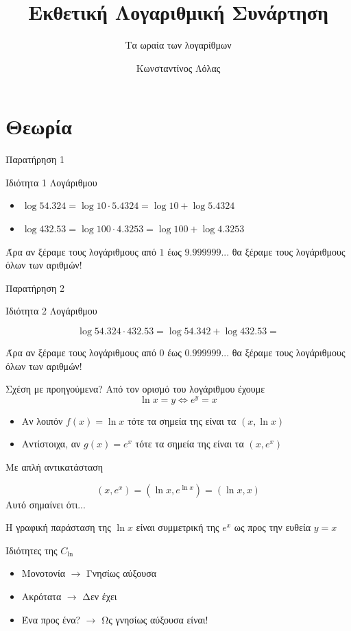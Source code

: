 \documentclass{presentation}
\title{Εκθετική Λογαριθμική Συνάρτηση}
\subtitle{Τα ωραία των λογαρίθμων}
\author[Λόλας]{Κωνσταντίνος Λόλας}
\date{}
\begin{document}
\begin{frame}
  \titlepage
\end{frame}

\section{Θεωρία}
\begin{frame}{Παρατήρηση 1}
  \begin{block}{Ιδιότητα 1 Λογάριθμου}
    \begin{itemize}
      \item<1-> $\log 54.324=\log 10\cdot 5.4324=\log 10+\log 5.4324$
      \item<2-> $\log 432.53=\log 100\cdot 4.3253 = \log 100 + \log 4.3253$
    \end{itemize}

  \end{block}
  Άρα αν ξέραμε τους λογάριθμους από $1$ έως $9.999999...$ θα ξέραμε τους λογάριθμους όλων των αριθμών!
\end{frame}

\begin{frame}{Παρατήρηση 2}
  \begin{block}{Ιδιότητα 2 Λογάριθμου}

    $$\log 54.324\cdot 432.53 = \log 54.342 + \log 432.53 = $$

  \end{block}
  Άρα αν ξέραμε τους λογάριθμους από $0$ έως $0.999999...$ θα ξέραμε τους λογάριθμους όλων των αριθμών!
\end{frame}

\begin{frame}{Σχέση με προηγούμενα?}
  Από τον ορισμό του λογάριθμου έχουμε
  $$\ln x=y\iff e^y=x$$
  \begin{itemize}
    \item Αν λοιπόν $f(x)=\ln x$ τότε τα σημεία της είναι τα $(x,\ln x)$
    \item Αντίστοιχα, αν $g(x)=e^x$ τότε τα σημεία της είναι τα $(x,e^x)$
  \end{itemize}
  Με απλή αντικατάσταση

  $$(x,e^x)=(\ln x, e^{\ln x})=(\ln x,x)$$
   {Αυτό σημαίνει ότι...}

   {Η γραφική παράσταση της $\ln x$ είναι συμμετρική της $e^x$ ως προς την ευθεία $y=x$}
\end{frame}

\begin{frame}{Ιδιότητες της $C_{\ln}$}
  \begin{itemize}
    \item Μονοτονία  {$\rightarrow$ Γνησίως αύξουσα}
    \item Ακρότατα  {$\rightarrow$ Δεν έχει}
    \item Ένα προς ένα?  {$\rightarrow$ Ως γνησίως αύξουσα είναι!}
  \end{itemize}
\end{frame}
\end{document}
